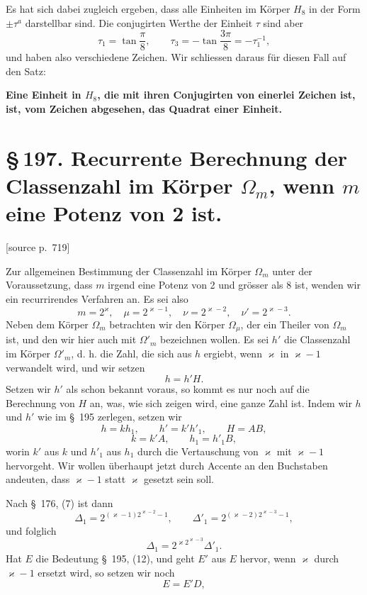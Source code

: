 \documentclass[11pt]{article}
\newcommand{\srcpage}[1]{\par\medskip\noindent\textsf{[source p.~#1]}\par\smallskip}
\begin{document}
Es hat sich dabei zugleich ergeben, dass alle Einheiten im Körper $H_8$ in der Form $\pm\tau^a$ darstellbar sind. Die conjugirten Werthe der Einheit $\tau$ sind aber
\[
\tau_1=\tan\frac\pi8,
\qquad
\tau_3=-\tan\frac{3\pi}{8}=-\tau_1^{-1},
\]
und haben also verschiedene Zeichen. Wir schliessen daraus für diesen Fall auf den Satz:
\begin{center}
\textbf{Eine Einheit in $H_8$, die mit ihren Conjugirten von einerlei Zeichen ist, ist, vom Zeichen abgesehen, das Quadrat einer Einheit.}
\end{center}

\section*{\S\,197. Recurrente Berechnung der Classenzahl im Körper $\Omega_m$, wenn $m$ eine Potenz von 2 ist.}

\srcpage{719}
Zur allgemeinen Bestimmung der Classenzahl im Körper $\Omega_m$ unter der Voraussetzung, dass $m$ irgend eine Potenz von 2 und grösser als 8 ist, wenden wir ein recurrirendes Verfahren an. Es sei also
\begin{equation}
m=2^\varkappa,
\quad \mu=2^{\varkappa-1},
\quad \nu=2^{\varkappa-2},
\quad \nu'=2^{\varkappa-3}.
\tag{1}
\end{equation}
Neben dem Körper $\Omega_m$ betrachten wir den Körper $\Omega_\mu$, der ein Theiler von $\Omega_m$ ist, und den wir hier auch mit $\Omega'_m$ bezeichnen wollen. Es sei $h'$ die Classenzahl im Körper $\Omega'_m$, d. h. die Zahl, die sich aus $h$ ergiebt, wenn $\varkappa$ in $\varkappa-1$ verwandelt wird, und wir setzen
\begin{equation}
h=h'H.
\tag{2}
\end{equation}
Setzen wir $h'$ als schon bekannt voraus, so kommt es nur noch auf die Berechnung von $H$ an, was, wie sich zeigen wird, eine ganze Zahl ist. Indem wir $h$ und $h'$ wie im \S~195 zerlegen, setzen wir
\begin{equation}
h=kh_1,
\qquad
h'=k'h'_1,
\qquad
H=AB,
\tag{3}
\end{equation}
\begin{equation}
k=k'A,
\qquad
h_1=h'_1B,
\tag{4}
\end{equation}
worin $k'$ aus $k$ und $h'_1$ aus $h_1$ durch die Vertauschung von $\varkappa$ mit $\varkappa-1$ hervorgeht. Wir wollen überhaupt jetzt durch Accente an den Buchstaben andeuten, dass $\varkappa-1$ statt $\varkappa$ gesetzt sein soll.

Nach \S~176, (7) ist dann
\[
\Delta_1=2^{(\varkappa-1)2^{\varkappa-2}-1},
\qquad
\Delta'_1=2^{(\varkappa-2)2^{\varkappa-3}-1},
\]
und folglich
\begin{equation}
\Delta_1=2^{\varkappa2^{\varkappa-3}}\Delta'_1.
\tag{5}
\end{equation}
Hat $E$ die Bedeutung \S~195, (12), und geht $E'$ aus $E$ hervor, wenn $\varkappa$ durch $\varkappa-1$ ersetzt wird, so setzen wir noch
\begin{equation}
E=E'D,
\tag{6}
\end{equation}
\end{document}
